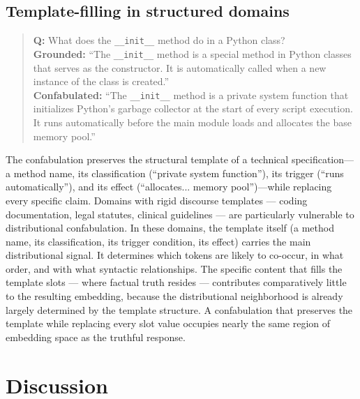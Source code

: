 \documentclass[11pt]{article}
\begin{document}
\subsection{Template-filling in structured domains}

\begin{quote}
\textbf{Q:} What does the \texttt{\_\_init\_\_} method do in a Python class? \\[5pt]
\textbf{Grounded:} ``The \texttt{\_\_init\_\_} method is a special method in Python classes that serves as the constructor. It is automatically called when a new instance of the class is created.'' \\[5pt]
\textbf{Confabulated:} ``The \texttt{\_\_init\_\_} method is a private system function that initializes Python's garbage collector at the start of every script execution. It runs automatically before the main module loads and allocates the base memory pool.''
\end{quote}

The confabulation preserves the structural template of a technical specification---a method name, its classification (``private system function''), its trigger (``runs automatically''), and its effect (``allocates... memory pool'')---while replacing every specific claim. Domains with rigid discourse templates — coding documentation, legal statutes, clinical guidelines — are particularly vulnerable to distributional confabulation. In these domains, the template itself (a method name, its classification, its trigger condition, its effect) carries the main distributional signal. It determines which tokens are likely to co-occur, in what order, and with what syntactic relationships. The specific content that fills the template slots — where factual truth resides — contributes comparatively little to the resulting embedding, because the distributional neighborhood is already largely determined by the template structure. A confabulation that preserves the template while replacing every slot value occupies nearly the same region of embedding space as the truthful response.


\section{Discussion}
\label{sec:discussion}
\end{document}
